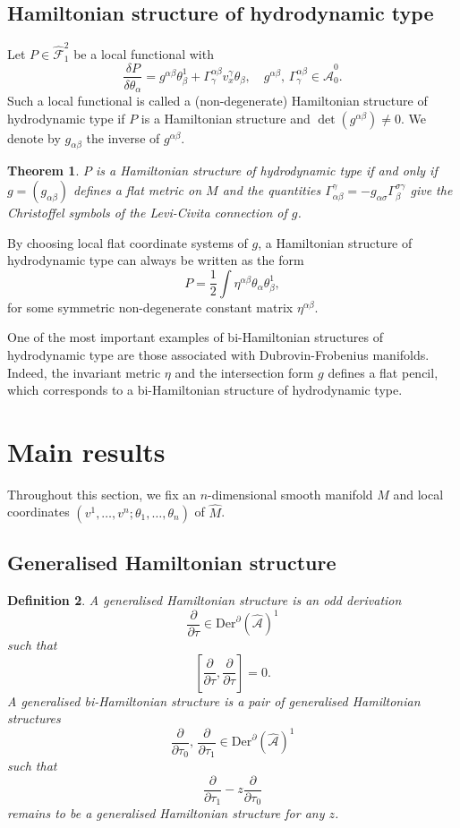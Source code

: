 \documentclass[11pt,a4paper]{amsart}
\numberwithin{equation}{section}
\newtheorem{theorem}{Theorem}[section]
\newtheorem{definition}[theorem]{Definition}
\newcommand{\derx}{\mathrm{Der}^{\qp}(\hm A)}
\newcommand{\diff}[2]{\frac{\partial #1}{\partial #2}}
\newcommand{\qa}{\alpha}
\newcommand{\qb}{\beta}
\newcommand{\qg}{\gamma}
\newcommand{\qs}{\sigma}
\newcommand{\qt}{\tau}
\newcommand{\qth}{\theta}
\newcommand{\qp}{\partial}
\newcommand{\Qg}{\Gamma}
\newcommand{\vard}[2]{\frac{\delta #1}{\delta #2}}
\newcommand{\hm}[1]{\hat{\mathcal #1}}
\newcommand{\fk}[2]{\left[#1, #2\right]}
\newcommand{\jja}{\mathcal{\hat A}}
\newcommand{\jjf}{\mathcal{\hat F}}
\numberwithin{equation}{section}
\begin{document}
\subsection{Hamiltonian structure of hydrodynamic type}
Let $P\in\jjf^2_1$ be a local functional with
\[
\vard{P}{\qth_\qa} = g^{\qa\qb}\qth_\qb^1+\Qg^{\qa\qb}_\qg v^\qg_x\qth_\qb,\quad g^{\qa\qb},\,\Qg^{\qa\qb}_\qg \in\jja^0_0.
\]
Such a local functional is called a (non-degenerate) Hamiltonian structure of hydrodynamic type if $P$ is a Hamiltonian structure and $\det(g^{\qa\qb})\neq 0$. We denote by $g_{\qa\qb}$ the inverse of $g^{\qa\qb}$.
\begin{theorem}\cite{DN84}
  \label{AR}
  $P$ is a Hamiltonian structure of hydrodynamic type if and only if $g = (g_{\qa\qb})$ defines a flat metric on $M$ and the quantities $\Gamma^{\qg}_{\qa\qb}=-g_{\qa\qs}\Gamma^{\qs\qg}_{\qb}$ give the Christoffel symbols of the Levi-Civita connection of $g$.
\end{theorem}
By choosing local flat coordinate systems of $g$, a Hamiltonian structure of hydrodynamic type can always be written as the form 
\[
P = \frac12\int\eta^{\qa\qb}\qth_\qa\qth_\qb^1,
\]
for some symmetric non-degenerate constant matrix $\eta^{\qa\qb}$.

One of the most important examples of bi-Hamiltonian structures of hydrodynamic type are those associated with Dubrovin-Frobenius manifolds. Indeed, the invariant metric $\eta$ and the intersection form $g$ defines a flat pencil, which corresponds to a bi-Hamiltonian structure of hydrodynamic type.


\section{Main results}
Throughout this section, we fix an $n$-dimensional smooth manifold $M$ and local coordinates $(v^1,\dots,v^n;\qth_1,\dots,\qth_n)$ of $\hat M$.
\subsection{Generalised Hamiltonian structure}
\begin{definition}
  A generalised Hamiltonian structure is an odd derivation 
  \[
  \diff{}{\qt}\in\derx^1
  \]
  such that
  \[
  \fk{\diff{}{\qt}}{\diff{}{\qt}} = 0.
  \]
  A generalised bi-Hamiltonian structure is a pair of generalised Hamiltonian structures 
  \[
  \diff{}{\qt_0},\,\diff{}{\qt_1}\in\derx^1
  \]
  such that
  \[
  \diff{}{\qt_1}-z \diff{}{\qt_0}
  \]
  remains to be a generalised Hamiltonian structure for any $z$.
\end{definition}
\end{document}
